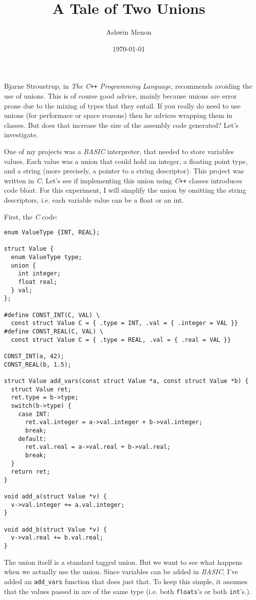 \documentclass{article}
\begin{document}
\title{A Tale of Two Unions}
\author{Ashwin Menon}
\date{\today}
\maketitle

Bjarne Stroustrup, in \emph{The C\texttt{++} Programming Language}, recommends
avoiding the use of unions. This is of course good advice, mainly because unions
are error prone due to the mixing of types that they entail. If you really do
need to use unions (for performace or space reasons) then he advices wrapping
them in classes. But does that increase the size of the assembly code generated?
Let’s investigate.

One of my projects was a \emph{BASIC} interpreter, that needed to store variables values.
Each value was a union that could hold an integer, a floating point type, and a
string (more precisely, a pointer to a string descriptor). This project was 
written in \emph{C}. Let’s see if implementing this union using \emph{C\texttt{++}}
classes introduces code bloat. For this experiment, I will simplify the union by
omitting the string descriptors, i.e. each variable value can be a float or an int.

First, the \emph{C} code:

\begin{lstlisting}
enum ValueType {INT, REAL};

struct Value {
  enum ValueType type; 
  union {
    int integer;
    float real;
  } val;
};

#define CONST_INT(C, VAL) \
  const struct Value C = { .type = INT, .val = { .integer = VAL }}
#define CONST_REAL(C, VAL) \
  const struct Value C = { .type = REAL, .val = { .real = VAL }}

CONST_INT(a, 42);
CONST_REAL(b, 1.5);

struct Value add_vars(const struct Value *a, const struct Value *b) {
  struct Value ret;
  ret.type = b->type;
  switch(b->type) {
    case INT: 
      ret.val.integer = a->val.integer + b->val.integer;
      break;
    default:
      ret.val.real = a->val.real + b->val.real;
      break;
  }
  return ret;
}

void add_a(struct Value *v) {
  v->val.integer += a.val.integer;
}

void add_b(struct Value *v) {
  v->val.real += b.val.real;
}
\end{lstlisting}

The union itself is a standard tagged union. But we want to see what happens when 
we actually use the union. Since variables can be added in \emph{BASIC}, I’ve 
added an \lstinline|add_vars| function that does just that. To keep this simple, it 
assumes that the values passed in are of the same type (i.e. both 
\lstinline|floats|'s or both \lstinline|int|'s.).
\end{document}
